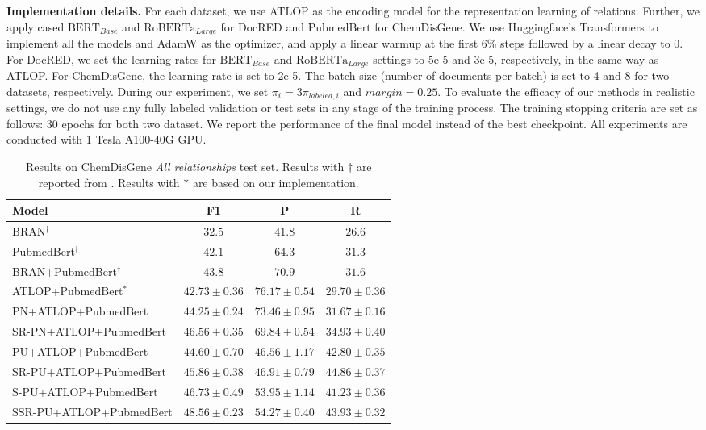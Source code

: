 \documentclass[11pt]{article}
\begin{document}
\textbf{Implementation details.} \enspace For each dataset, we use ATLOP \citep{Zhou_Huang_Ma_Huang_2021} as the encoding model for the representation learning of relations. Further, we apply cased $\mathrm{BERT}_{Base}$ \citep{devlin-etal-2019-bert} and $\mathrm{RoBERTa}_{Large}$ \citep{liu2019roberta} for DocRED and $\mathrm{PubmedBert}$ \citep{10.1145/3458754} for ChemDisGene. We use Huggingface's Transformers \citep{wolf-etal-2020-transformers} to implement all the models and AdamW \citep{loshchilov2018decoupled} as the optimizer, and apply a linear warmup \citep{goyal2017accurate} at the first 6\% steps followed by a linear decay to 0. For DocRED, we set the learning rates for $\mathrm{BERT}_{Base}$ and $\mathrm{RoBERTa}_{Large}$ settings to 5e-5 and 3e-5, respectively, in the same way as ATLOP. For ChemDisGene, the learning rate is set to 2e-5. The batch size (number of documents per batch) is set to 4 and 8 for two datasets, respectively. During our experiment, we set $\pi_{i}=3\pi_{labeled,i}$ and $margin=0.25$. To evaluate the efficacy of our methods in realistic settings, we do not use any fully labeled validation or test sets in any stage of the training process. The training stopping criteria are set as follows: 30 epochs for both two dataset. We report the performance of the final model instead of the best checkpoint. All experiments are conducted with 1 Tesla A100-40G GPU.

\begin{table*}
\centering
\begin{tabular}{lccc}
\hline \textbf{Model} & \textbf{F1} & \textbf{P} & \textbf{R} \\
\hline BRAN$^{\dagger}$ & $32.5$ & $41.8$ & $26.6$ \\
PubmedBert$^{\dagger}$ & $42.1$ & $64.3$ & $31.3$ \\
BRAN+PubmedBert$^{\dagger}$ & $43.8$ & $70.9$ & $31.6$ \\
\hline
\hline ATLOP+PubmedBert$^{\ast}$ & $42.73 \pm 0.36$ & $\mathbf{76.17} \pm \mathbf{0.54}$ & $29.70 \pm 0.36$ \\
PN+ATLOP+PubmedBert & $44.25 \pm 0.24$ & $73.46 \pm 0.95$ & $31.67 \pm 0.16$ \\
SR-PN+ATLOP+PubmedBert & $46.56 \pm 0.35$ & $69.84 \pm 0.54$ & $34.93 \pm 0.40$ \\
PU+ATLOP+PubmedBert & $44.60 \pm 0.70$ & $46.56 \pm 1.17$ & $42.80 \pm 0.35$ \\
SR-PU+ATLOP+PubmedBert & $45.86 \pm 0.38$ & $46.91 \pm 0.79$ & $\mathbf{44.86} \pm \mathbf{0.37}$ \\
S-PU+ATLOP+PubmedBert & $46.73 \pm 0.49$ & $53.95 \pm 1.14$ & $41.23 \pm 0.36$ \\
SSR-PU+ATLOP+PubmedBert & $\mathbf{48.56} \pm \mathbf{0.23}$ & $54.27 \pm 0.40$ & $43.93 \pm 0.32$ \\
\hline
\end{tabular}
\caption{\label{table4}
Results on ChemDisGene \emph{All relationships} test set. Results with $\dagger$ are reported from \citep{zhang-etal-2022-distant}. Results with $\ast$ are based on our implementation.
}
\end{table*}
\end{document}
